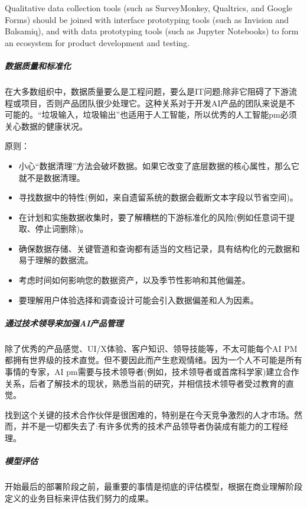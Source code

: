 \documentclass[letterpaper,11pt,english]{sphinxmanual}
\begin{document}
Qualitative data collection tools (such as SurveyMonkey, Qualtrics, and
Google Forms) should be joined with interface prototyping tools (such as
Invision and Balsamiq), and with data prototyping tools (such as Jupyter
Notebooks) to form an ecosystem for product development and testing.


\subparagraph{数据质量和标准化}
\label{\detokenize{chapter_project/process:id24}}
在大多数组织中，数据质量要么是工程问题，要么是IT问题;除非它阻碍了下游流程或项目，否则产品团队很少处理它。这种关系对于开发AI产品的团队来说是不可能的。“垃圾输入，垃圾输出”也适用于人工智能，所以优秀的人工智能pm必须关心数据的健康状况。

原则：
\begin{itemize}
\item {} 
小心“数据清理”方法会破坏数据。如果它改变了底层数据的核心属性，那么它就不是数据清理。

\item {} 
寻找数据中的特性(例如，来自遗留系统的数据会截断文本字段以节省空间)。

\item {} 
在计划和实施数据收集时，要了解糟糕的下游标准化的风险(例如任意词干提取、停止词删除)。

\item {} 
确保数据存储、关键管道和查询都有适当的文档记录，具有结构化的元数据和易于理解的数据流。

\item {} 
考虑时间如何影响您的数据资产，以及季节性影响和其他偏差。

\item {} 
要理解用户体验选择和调查设计可能会引入数据偏差和人为因素。

\end{itemize}


\subparagraph{通过技术领导来加强AI产品管理}
\label{\detokenize{chapter_project/process:id25}}
除了优秀的产品感觉、UI/X体验、客户知识、领导技能等，不太可能每个AI
PM都拥有世界级的技术直觉。但不要因此而产生悲观情绪。因为一个人不可能是所有事情的专家，AI
pm需要与技术领导者(例如，技术领导者或首席科学家)建立合作关系，后者了解技术的现状，熟悉当前的研究，并相信技术领导者受过教育的直觉。

找到这个关键的技术合作伙伴是很困难的，特别是在今天竞争激烈的人才市场。然而，并不是一切都失去了:有许多优秀的技术产品领导者伪装成有能力的工程经理。


\subparagraph{模型评估}
\label{\detokenize{chapter_project/process:id26}}
开始最后的部署阶段之前，最重要的事情是彻底的评估模型，根据在商业理解阶段定义的业务目标来评估我们努力的成果。
\end{document}

